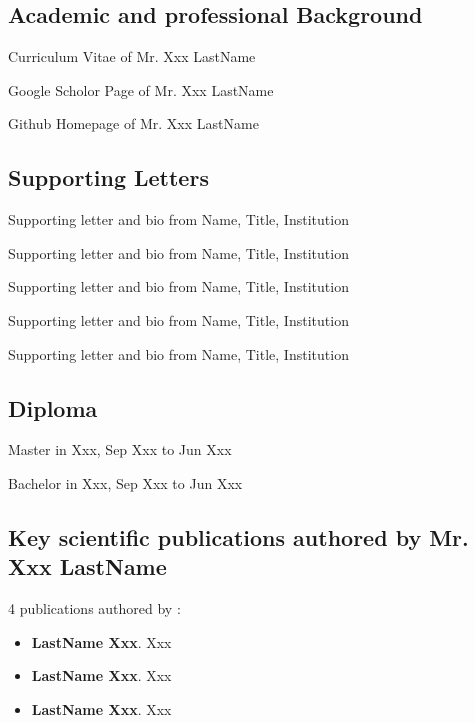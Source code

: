 \documentclass[11pt]{article}
\begin{document}
\begin{thebibliography}{9}

\subsection*{Academic and professional Background}

Curriculum Vitae of Mr. Xxx LastName

Google Scholor Page of Mr. Xxx LastName

Github Homepage of Mr. Xxx LastName


\subsection*{Supporting Letters}

Supporting letter and bio from Name, Title, Institution

Supporting letter and bio from Name, Title, Institution

Supporting letter and bio from Name, Title, Institution

Supporting letter and bio from Name, Title, Institution

Supporting letter and bio from Name, Title, Institution



\subsection*{Diploma}

\drs Master in Xxx, Sep Xxx to Jun Xxx

\drs Bachelor in Xxx, Sep Xxx to Jun Xxx


\subsection*{Key scientific publications authored by Mr. Xxx LastName}


4 publications authored by \dr:
\begin{itemize}
    \item \textbf{LastName Xxx}. Xxx

    \item \textbf{LastName Xxx}. Xxx

    \item \textbf{LastName Xxx}. Xxx


\end{itemize}
\end{thebibliography}
\end{document}
